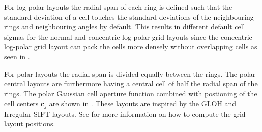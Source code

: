 \documentclass[thesis.tex]{subfiles}
\begin{document}
For log-polar layouts the radial span of each ring is defined such that the standard deviation of a cell touches the standard deviations of the neighbouring rings and neighbouring angles by default. This results in different default cell sigmas for the normal and concentric log-polar grid layouts since the concentric log-polar grid layout can pack the cells more densely without overlapping cells as seen in .

For polar layouts the radial span is divided equally between the rings. The polar central layouts are furthermore having a central cell of half the radial span of the rings. The polar Gaussian cell aperture function combined with postioning of the cell centers $\boldsymbol{c}_j$ are shown in . These layouts are inspired by the GLOH \cite{mikolajczyk2005performance} and Irregular SIFT \cite{cui2009scale} layouts.
See  for more information on how to compute the grid layout positions.
\end{document}
